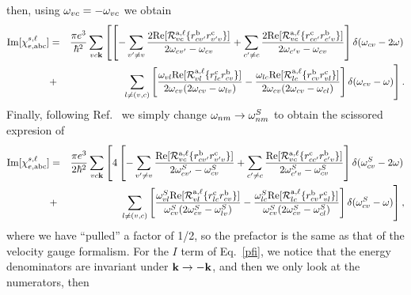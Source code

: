 \documentclass[floatfix,prb,aps,superscriptaddress,11pt,preprint]{revtex4}
\begin{document}
then, using $\omega_{vc}=-\omega_{vc}$ we obtain
\begin{eqnarray}\label{imchie3n}
\mathrm{Im}[\chi_{e,\mathrm{a}\mathrm{b}\mathrm{c}}^{s,\ell}]
&=&
\frac{\pi e^3}{\hbar^2} 
\sum_{vc\mathbf{k}}
\left[
\left[
-\sum_{v'\ne v}
\frac{2\mathrm{Re}[{\cal R}^{\mathrm{a},\ell}_{vc}\{r^{\mathrm{b}}_{cv'}r^{\mathrm{c}}_{v'v}\}]
}{2\omega_{cv'}-\omega_{cv}}
+
\sum_{c'\ne c}
\frac{2\mathrm{Re}[{\cal R}^{\mathrm{a},\ell}_{vc}\{r^{\mathrm{c}}_{cc'}r^{\mathrm{b}}_{c'v}\}]}
{2\omega_{c'v}-\omega_{cv}}
\right]
\delta(\omega_{cv}-2\omega)
\right.
\nonumber\\
&+&
\left.
\sum_{l\neq(v,c)}
\left[
\frac{\omega_{vl}\mathrm{Re}[{\cal R}^{\mathrm{a},\ell}_{vl}\{r^{\mathrm{c}}_{lc}r^{\mathrm{b}}_{cv}\}]}
{2\omega_{cv}(2\omega_{cv}-\omega_{lv})}
-
\frac{\omega_{lc}\mathrm{Re}[{\cal R}^{\mathrm{a},\ell}_{lc}\{r^{\mathrm{b}}_{cv}r^{\mathrm{c}}_{vl}\}]}
{2\omega_{cv}(2\omega_{cv}-\omega_{cl})}
\right]
\delta(\omega_{cv}-\omega)
\right]
.
\end{eqnarray}  
Finally, following Ref.~ we simply change
$\omega_{nm}\to\omega_{nm}^S$ to obtain the scissored expresion of
\begin{eqnarray}\label{imchies}
\mathrm{Im}[\chi_{e,\mathrm{a}\mathrm{b}\mathrm{c}}^{s,\ell}]
&=&
\frac{\pi e^3}{2\hbar^2} 
\sum_{vc\mathbf{k}}
\left[
4
\left[
-\sum_{v'\ne v}
\frac{\mathrm{Re}[{\cal R}^{\mathrm{a},\ell}_{vc}\{r^{\mathrm{b}}_{cv'}r^{\mathrm{c}}_{v'v}\}]
}{2\omega^S_{cv'}-\omega^S_{cv}}
+
\sum_{c'\ne c}
\frac{\mathrm{Re}[{\cal R}^{\mathrm{a},\ell}_{vc}\{r^{\mathrm{c}}_{cc'}r^{\mathrm{b}}_{c'v}\}]}
{2\omega^S_{c'v}-\omega^S_{cv}}
\right]
\delta(\omega^S_{cv}-2\omega)
\right.
\nonumber\\
&+&
\left.
\sum_{l\neq(v,c)}
\left[
\frac{\omega^S_{vl}\mathrm{Re}[{\cal R}^{\mathrm{a},\ell}_{vl}\{r^{\mathrm{c}}_{lc}r^{\mathrm{b}}_{cv}\}]}
{\omega^S_{cv}(2\omega^S_{cv}-\omega^S_{lv})}
-
\frac{\omega^S_{lc}\mathrm{Re}[{\cal R}^{\mathrm{a},\ell}_{lc}\{r^{\mathrm{b}}_{cv}r^{\mathrm{c}}_{vl}\}]}
{\omega^S_{cv}(2\omega^S_{cv}-\omega^S_{cl})}
\right]
\delta(\omega^S_{cv}-\omega)
\right]
,
\end{eqnarray}  
where we have ``pulled'' a factor of 1/2, so the prefactor is the same
as that of the velocity gauge formalism.\cite{cabellosPRB09} 
For the $I$ term of Eq.~\eqref{pfi}, we notice that the energy
denominators are invariant under $\mathbf{k}\to -\mathbf{k}$, and then we only
look at the numerators, then
\end{document}
